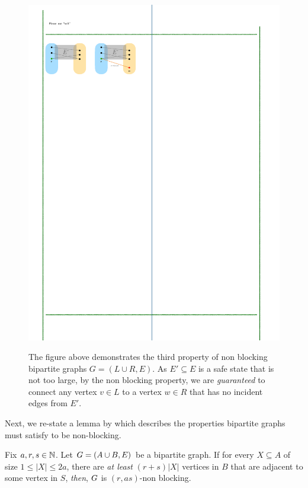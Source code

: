 \documentclass[11pt]{article}
\begin{document}
\begin{figure}[h]
  \center
  {\includegraphics{assets/non-blocking-networks.pdf}}
{\caption{\small The figure above demonstrates the third property of non blocking bipartite graphs $G=(L\cup R, E)$. As $E' \subseteq E$ is a safe state that is not too large, by the non blocking property, we are \emph{guaranteed} to connect any vertex $v \in L$ to a vertex $w \in R$ that has no incident edges from $E'$.}
}
\label{fig:test}

\end{figure}

Next, we re-state a lemma by \citep[Proposition 1]{feldman1988wide} which describes the properties bipartite graphs must satisfy to be non-blocking.

\begin{lemma}\label{lemma:condtions-for-non-block}
Fix $a, r, s \in \mathbb{N}$. Let $G = (A \cup B, E)$ be a bipartite graph.
If for every $X \subseteq A$ of size $1 \leq |X| \leq 2a$, there are \emph{at least} $(r + s)|X|$ vertices in $B$ that are adjacent to some vertex in $S$, \emph{then}, $G$ is $(r, as)$-non blocking.
\end{lemma}
\end{document}

